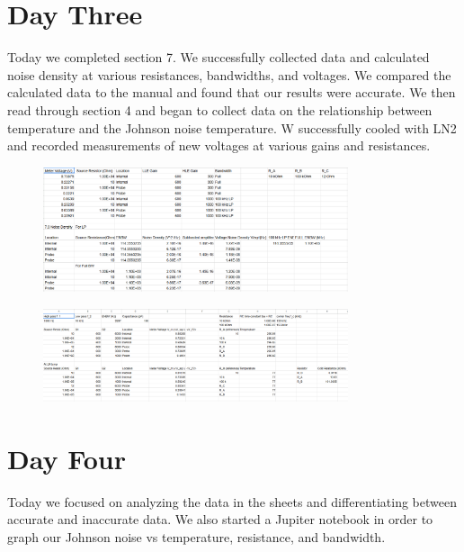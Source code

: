 \documentclass{article}
\begin{document}
\section*{Day Three}
Today we completed section 7. We successfully collected data and calculated noise density at various resistances, bandwidths, and voltages. We compared the calculated data to the manual and found that our results were accurate. We then read through section 4 and began to collect data on the relationship between temperature and the Johnson noise temperature. W successfully cooled with LN2 and recorded measurements of new voltages at various gains and resistances.
\begin{figure}[h]
    \centering
    \includegraphics[width=0.8\textwidth]{lab_notebook/day3.PNG}
   
    \label{Section 1 data}
\end{figure}
\begin{figure}[h]
    \centering
    \includegraphics[width=0.8\textwidth]{lab_notebook/day3-2.PNG}
   
    \label{Section 1 data}
\end{figure}
\section*{Day Four}
Today we focused on analyzing the data in the sheets and differentiating between accurate and inaccurate data. We also started a Jupiter notebook in order to graph our Johnson noise vs temperature, resistance, and bandwidth.  
\end{document}
